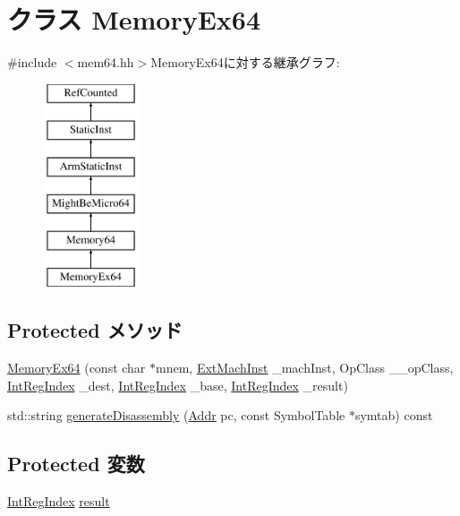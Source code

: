 \hypertarget{classArmISA_1_1MemoryEx64}{
\section{クラス MemoryEx64}
\label{classArmISA_1_1MemoryEx64}
}


{\ttfamily \#include $<$mem64.hh$>$}MemoryEx64に対する継承グラフ:\begin{figure}[H]
\begin{center}
\leavevmode
\includegraphics[height=6cm]{classArmISA_1_1MemoryEx64}
\end{center}
\end{figure}
\subsection*{Protected メソッド}
\begin{DoxyCompactItemize}
\item 
\hyperlink{classArmISA_1_1MemoryEx64_aeda6f17c52c2b0d39707af4284adaaa3}{MemoryEx64} (const char $\ast$mnem, \hyperlink{classStaticInst_a5605d4fc727eae9e595325c90c0ec108}{ExtMachInst} \_\-machInst, OpClass \_\-\_\-opClass, \hyperlink{namespaceArmISA_ae64680ba9fb526106829d6bf92fc791b}{IntRegIndex} \_\-dest, \hyperlink{namespaceArmISA_ae64680ba9fb526106829d6bf92fc791b}{IntRegIndex} \_\-base, \hyperlink{namespaceArmISA_ae64680ba9fb526106829d6bf92fc791b}{IntRegIndex} \_\-result)
\item 
std::string \hyperlink{classArmISA_1_1MemoryEx64_a95d323a22a5f07e14d6b4c9385a91896}{generateDisassembly} (\hyperlink{classm5_1_1params_1_1Addr}{Addr} pc, const SymbolTable $\ast$symtab) const 
\end{DoxyCompactItemize}
\subsection*{Protected 変数}
\begin{DoxyCompactItemize}
\item 
\hyperlink{namespaceArmISA_ae64680ba9fb526106829d6bf92fc791b}{IntRegIndex} \hyperlink{classArmISA_1_1MemoryEx64_a43f8ecc8130e5285e0ae2134151d6d6a}{result}
\end{DoxyCompactItemize}


